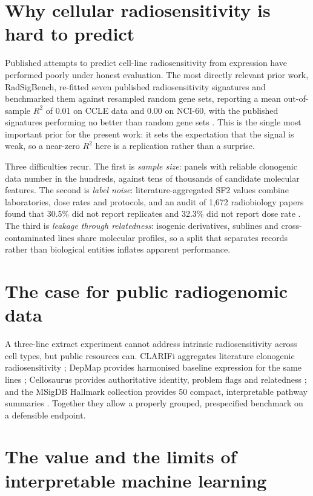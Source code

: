\section{Why cellular radiosensitivity is hard to predict}

Published attempts to predict cell-line radiosensitivity from expression have performed
poorly under honest evaluation. The most directly relevant prior work, RadSigBench,
re-fitted seven published radiosensitivity signatures and benchmarked them against
resampled random gene sets, reporting a mean out-of-sample $R^2$ of 0.01 on CCLE data and
0.00 on NCI-60, with the published signatures performing no better than random gene sets
\parencite{oconnor2022}. This is the single most important prior for the present work: it
sets the expectation that the signal is weak, so a near-zero $R^2$ here is a replication
rather than a surprise.

Three difficulties recur. The first is \emph{sample size}: panels with reliable clonogenic
data number in the hundreds, against tens of thousands of candidate molecular features. The
second is \emph{label noise}: literature-aggregated SF2 values combine laboratories, dose
rates and protocols, and an audit of 1,672 radiobiology papers found that 30.5\% did not
report replicates and 32.3\% did not report dose rate \parencite{oike2020}. The third is
\emph{leakage through relatedness}: isogenic derivatives, sublines and cross-contaminated
lines share molecular profiles, so a split that separates records rather than biological
entities inflates apparent performance.

\section{The case for public radiogenomic data}

A three-line extract experiment cannot address intrinsic radiosensitivity across cell
types, but public resources can. CLARIFi aggregates literature clonogenic radiosensitivity
\parencite{clarifi2024}; DepMap provides harmonised baseline expression for the same lines
\parencite{depmap24q4}; Cellosaurus provides authoritative identity, problem flags and
relatedness \parencite{bairoch2018}; and the MSigDB Hallmark collection provides 50 compact,
interpretable pathway summaries \parencite{liberzon2015}. Together they allow a properly
grouped, prespecified benchmark on a defensible endpoint.

\section{The value and the limits of interpretable machine learning}

